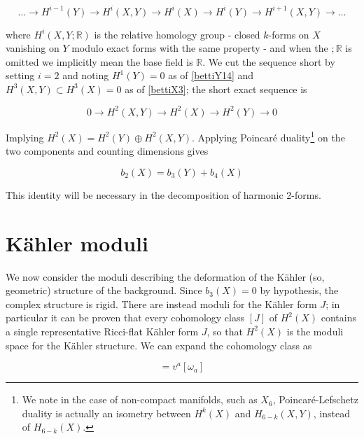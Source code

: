\begin{equation}
	\ldots \rightarrow H^{i-1}(Y) \rightarrow H^{i}(X,Y) \rightarrow H^i(X) \rightarrow H^i(Y) \rightarrow H^{i+1}(X,Y) \rightarrow \ldots
\end{equation}

where $H^i(X,Y;\mathbb{R})$ is the relative homology group - closed $k$-forms on $X$ vanishing on $Y$ modulo exact forms with the same property - and when the $;\mathbb{R}$ is omitted we implicitly mean the base field is $\mathbb{R}$. We cut the sequence short by setting $i=2$ and noting $H^1(Y) = 0$ as of \eqref{bettiY14} and $H^3(X,Y) \subset H^3(X) = 0$ as of \eqref{bettiX3}; the short exact sequence is

\begin{equation}
	0 \rightarrow H^2(X,Y) \rightarrow H^2(X) \rightarrow H^2(Y) \rightarrow 0
\end{equation}

Implying $H^2(X) = H^2(Y) \oplus H^2(X,Y)$. Applying Poincaré duality\footnote{We note in the case of non-compact manifolds, such as $X_6$, Poincar\'e-Lefschetz duality is actually an isometry between $H^k(X)$ and $H_{6-k}(X,Y)$, instead of $H_{6-k}(X)$.} on the two components and counting dimensions gives

\begin{equation}
	b_2(X) = b_3(Y) + b_4(X) \label{bettidentity}
\end{equation}

This identity will be necessary in the decomposition of harmonic 2-forms.

\section{K\"ahler moduli} \label{sec:heftkm}

We now consider the moduli describing the deformation of the K\"ahler (so, geometric) structure of the background. Since $b_3(X) = 0$ by hypothesis, the complex structure is rigid. There are instead moduli for the K\"ahler form $J$; in particular it can be proven \cite{goto} that every cohomology class $[J]$ of $H^2(X)$ contains a single representative Ricci-flat K\"ahler form $J$, so that $H^2(X)$ is the moduli space for the K\"ahler structure. We can expand the cohomology class as

\begin{equation}
	[J] = v^a [\omega_a] \label{integraldecomposition}
\end{equation}

